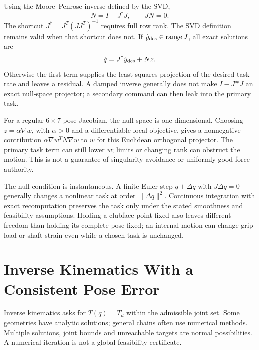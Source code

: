 Using the Moore--Penrose inverse defined by the SVD,
\begin{equation}
 \label{eq:null_space_projector}
 N=I-J^\dagger J,\qquad JN=0.
\end{equation}
The shortcut $J^\dagger=J^T(JJ^T)^{-1}$ requires full row rank. The SVD definition remains valid when that shortcut does not. If $\dot y_{\rm des}\in\operatorname{range}J$, all exact solutions are
\begin{equation}
 \label{eq:redundancy_resolution}
 \dot q=J^\dagger\dot y_{\rm des}+Nz.
\end{equation}
Otherwise the first term supplies the least-squares projection of the desired task rate and leaves a residual. A damped inverse generally does not make $I-J^\#J$ an exact null-space projector; a secondary command can then leak into the primary task.

\label{ex:7dof_null_space}
For a regular $6\times7$ pose Jacobian, the null space is one-dimensional. Choosing $z=\alpha\nabla w$, with $\alpha>0$ and a differentiable local objective, gives a nonnegative contribution $\alpha\nabla w^TN\nabla w$ to $\dot w$ for this Euclidean orthogonal projector. The primary task term can still lower $w$; limits or changing rank can obstruct the motion. This is not a guarantee of singularity avoidance or uniformly good force authority.

The null condition is instantaneous. A finite Euler step $q+\Delta q$ with $J\Delta q=0$ generally changes a nonlinear task at order $\|\Delta q\|^2$. Continuous integration with exact recomputation preserves the task only under the stated smoothness and feasibility assumptions. Holding a clubface point fixed also leaves different freedom than holding its complete pose fixed; an internal motion can change grip load or shaft strain even while a chosen task is unchanged.

\section{Inverse Kinematics With a Consistent Pose Error}
\label{sec:inverse_kinematics}

Inverse kinematics asks for $T(q)=T_d$ within the admissible joint set. Some geometries have analytic solutions; general chains often use numerical methods. Multiple solutions, joint bounds and unreachable targets are normal possibilities. A numerical iteration is not a global feasibility certificate.


